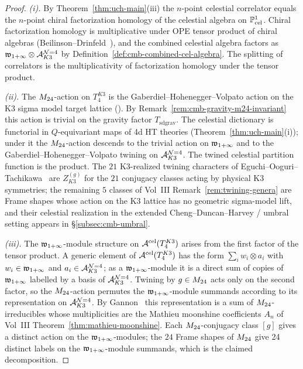 \begin{proof}
\emph{(i).}
By Theorem~\ref{thm:uch-main}(iii) the $n$-point celestial correlator
equals the $n$-point chiral factorization homology of the celestial
algebra on $\mathbb P^1_{\mathrm{cel}}$. Chiral factorization homology is
multiplicative under OPE tensor product of chiral algebras
(Beilinson--Drinfeld~\cite[\S 3.4]{BeilinsonDrinfeldChiral}), and the
combined celestial algebra factors as $\mathfrak w_{1+\infty} \otimes
\mathcal A^{\mathcal{N}{=}4}_{K3}$ by
Definition~\ref{def:cmb-combined-cel-algebra}. The splitting of
correlators is the multiplicativity of factorization homology under the
tensor product.

\emph{(ii).}
The $M_{24}$-action on $T_4^{K3}$ is the
Gaberdiel--Hohenegger--Volpato action on the K3 sigma model target
lattice (\cite{GaberdielHoheneggerVolpato10,GaberdielHoheneggerVolpato11}).
By Remark~\ref{rem:cmb-gravity-m24-invariant} this action is trivial on
the gravity factor $T_{\mathrm{sd grav}}$. The
celestial dictionary is functorial in $Q$-equivariant maps of
4d HT theories (Theorem~\ref{thm:uch-main}(i)); under it the
$M_{24}$-action descends to the trivial action on $\mathfrak w_{1+\infty}$ and to the
Gaberdiel--Hohenegger--Volpato twining on
$\mathcal A^{\mathcal{N}{=}4}_{K3}$. The twined celestial partition function
is the product. The $21$ K3-realized twining characters of
Eguchi--Ooguri--Tachikawa~\cite{EguchiOoguriTachikawa10} are
$Z_{K3}^{(g)}$ for the $21$ conjugacy classes acting by physical K3
symmetries; the remaining $5$ classes of Vol~III
Remark~\ref{rem:twining-genera} are Frame shapes whose action on
the K3 lattice has no geometric sigma-model lift,
and their celestial
realization in the extended
Cheng--Duncan--Harvey / umbral setting appears in
\S\ref{subsec:cmb-umbral}.

\emph{(iii).}
The $\mathfrak w_{1+\infty}$-module structure on $\mathcal A^{\mathrm{cel}}(T_4^{K3})$ arises from the
first factor of the tensor product. A generic element of
$\mathcal A^{\mathrm{cel}}(T_4^{K3})$ has the form $\sum_i w_i \otimes a_i$ with $w_i \in
\mathfrak w_{1+\infty}$ and $a_i \in \mathcal A^{\mathcal{N}{=}4}_{K3}$; as a $\mathfrak w_{1+\infty}$-module it
is a direct sum of copies of $\mathfrak w_{1+\infty}$ labelled by a basis of
$\mathcal A^{\mathcal{N}{=}4}_{K3}$. Twining by $g \in M_{24}$ acts only on
the second factor, so the $M_{24}$-action permutes the $\mathfrak w_{1+\infty}$-module
summands according to its representation on
$\mathcal A^{\mathcal{N}{=}4}_{K3}$. By Gannon~\cite{Gannon16} this
representation is a sum of $M_{24}$-irreducibles whose
multiplicities are the Mathieu moonshine coefficients $A_n$ of Vol~III
Theorem~\ref{thm:mathieu-moonshine}. Each $M_{24}$-conjugacy class
$[g]$ gives a distinct action on the $\mathfrak w_{1+\infty}$-modules; the $24$ Frame
shapes of $M_{24}$ give 24 distinct labels on the $\mathfrak w_{1+\infty}$-module
summands, which is the claimed decomposition.
\end{proof}

